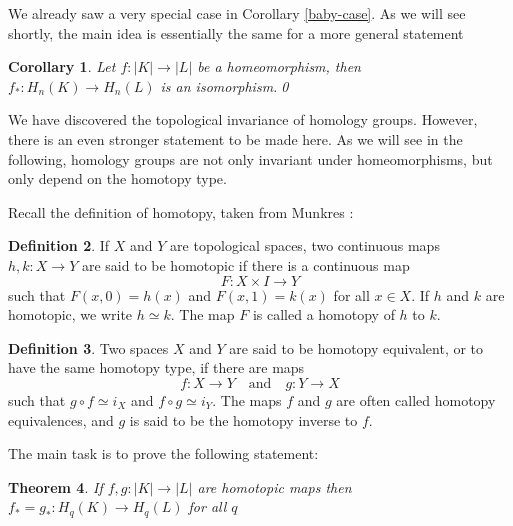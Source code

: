 \documentclass[toc=bib]{scrartcl}
\theoremstyle{plain}
\newtheorem{theorem}{Theorem}[section]
\newtheorem{corollary}[theorem]{Corollary}
\theoremstyle{definition}
\newtheorem	{definition}[theorem]{Definition}
\theoremstyle{remark}
\newcommand{\qandq}{\quad \text{and} \quad}
\begin{document}
We already saw a very special case in Corollary \ref{baby-case}. As we will see shortly, the main idea is essentially the same for a more general statement

\begin{corollary}
	Let $f: |K|\to |L| $ be a homeomorphism, then $f_\ast: H_n(K)\to H_n(L)$ is an isomorphism.\qed
\end{corollary}

We have discovered the topological invariance of homology groups. However, there is an even stronger statement to be made here. As we will see in the following, homology groups are not only invariant under homeomorphisms, but only depend on the homotopy type. 

Recall the definition of homotopy, taken from Munkres \cite[p. 94]{mu}:

\begin{definition}
	If $X$ and $Y$ are topological spaces, two continuous maps $h, k: X\to Y$ are said to be homotopic if there is a continuous map \[
	F: X\times I\to Y
	\]
	such that $F(x,0)=h(x)$ and $F(x,1)=k(x)$ for all $x\in X$. If $h$ and $k$ are homotopic, we write $h\simeq k$. The map $F$ is called a homotopy of $h$ to $k$. 
\end{definition}
\begin{definition}\label{def:hom-eq}
	Two spaces $X$ and $Y$ are said to be homotopy equivalent, or to have the same homotopy type, if there are maps\[
	f: X\to Y\qandq g:Y\to X
	\]
	such that $g\circ f\simeq i_X$ and $f\circ g\simeq i_Y$. The maps $f$ and $g$ are often called homotopy equivalences, and $g$ is said to be the homotopy inverse to $f$.
\end{definition}

The main task is to prove the following statement:

\begin{theorem}\label{homotopy_invariance}
	If $f,g:|K|\to |L|$ are homotopic maps then $f_\ast=g_\ast: H_q(K)\to H_q(L)$ for all $q$
\end{theorem}
\end{document}
